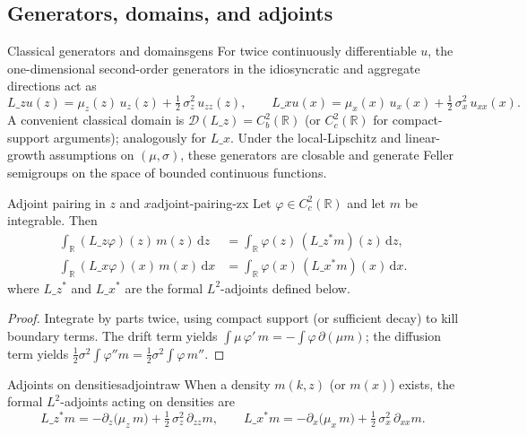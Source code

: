 \documentclass[11pt,letterpaper,oneside]{article}
\numberwithin{equation}{section}
\newcommand{\R}{\mathbb{R}}
\newcommand{\1}{\mathbf{1}}
\newcommand{\Lz}{L\_z}
\newcommand{\Lx}{L\_x}
\newcommand{\Lzadj}{L\_z^{\!*}}
\begin{document}
\subsection{Generators, domains, and adjoints}\label{sec:generators}

\begin{definition}{Classical generators and domains}{gens}
For twice continuously differentiable $u$, the one-dimensional second-order generators in the idiosyncratic and aggregate directions act as
\[
\Lz u(z)=\mu_z(z)\,u_z(z)+\tfrac12\,\sigma_z^2\,u_{zz}(z),\qquad
\Lx u(x)=\mu_x(x)\,u_x(x)+\tfrac12\,\sigma_x^2\,u_{xx}(x).
\]
A convenient classical domain is $\mathcal D(\Lz)=C_b^2(\R)$ (or $C_c^2(\R)$ for compact-support arguments); analogously for $\Lx$. Under the local-Lipschitz and linear-growth assumptions on $(\mu,\sigma)$, these generators are closable and generate Feller semigroups on the space of bounded continuous functions.
\end{definition}

\begin{lemma}{Adjoint pairing in $z$ and $x$}{adjoint-pairing-zx}
Let $\varphi\in C_c^2(\R)$ and let $m$ be integrable. Then
\[
\begin{aligned}
\int_{\R} (\Lz \varphi)(z)\, m(z)\,\mathrm dz &= \int_{\R} \varphi(z)\, (\Lzadj m)(z)\,\mathrm dz, \\
\int_{\R} (\Lx \varphi)(x)\, m(x)\,\mathrm dx &= \int_{\R} \varphi(x)\, (\Lx^{\!*} m)(x)\,\mathrm dx.
\end{aligned}
\]
where $\Lzadj$ and $\Lx^{\!*}$ are the formal $L^2$-adjoints defined below.
\end{lemma}

\begin{proof}
Integrate by parts twice, using compact support (or sufficient decay) to kill boundary terms. The drift term yields $\int \mu\,\varphi'\,m = -\int \varphi\,\partial(\mu m)$; the diffusion term yields $\tfrac12\sigma^2\int \varphi'' m = \tfrac12\sigma^2\int \varphi\, m''$.
\end{proof}

\begin{definition}{Adjoints on densities}{adjointraw}
When a density $m(k,z)$ (or $m(x)$) exists, the formal $L^2$-adjoints acting on densities are
\[
\Lzadj m = -\partial_z\big(\mu_z\, m\big) + \tfrac12\, \sigma_z^2\, \partial_{zz} m,\qquad
\Lx^{\!*} m = -\partial_x\big(\mu_x\, m\big) + \tfrac12\, \sigma_x^2\, \partial_{xx} m.
\]
\end{definition}
\end{document}
